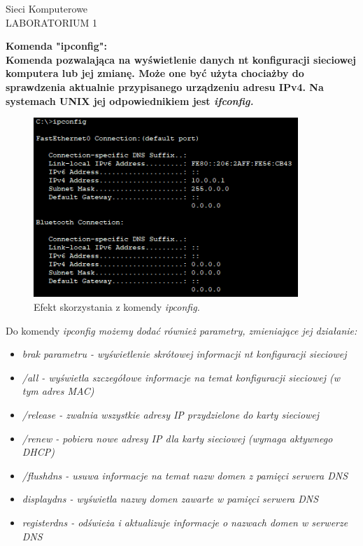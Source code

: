 \documentclass[a4paper,12pt]{article}
\newcommand{\h}[1]{\noindent \bf #1 \rm \\ \noindent}
\newcommand{\italic}[1]{\it #1 \rm}
\begin{document}
\begin{center}
	\LARGE
	Sieci Komputerowe \\
	\large
	LABORATORIUM 1 
\end{center}
\vspace{1cm}
	
\h{Komenda "ipconfig":}
Komenda pozwalająca na wyświetlenie danych nt konfiguracji sieciowej komputera lub jej zmianę. Może one być użyta chociażby do sprawdzenia aktualnie przypisanego urządzeniu adresu IPv4. Na systemach UNIX jej odpowiednikiem jest \it ifconfig\rm.

\begin{figure}[H]
	\centering
	\includegraphics[width=10cm]{fig1.png}
	\caption{Efekt skorzystania z komendy \it ipconfig\rm.}
\end{figure}

\noindent
Do komendy \it ipconfig \rm możemy dodać również parametry, zmieniające jej działanie:
\begin{itemize}
	\item \italic{brak parametru} - wyświetlenie skrótowej informacji nt konfiguracji sieciowej
	\item \italic{/all} - wyświetla szczegółowe informacje na temat konfiguracji sieciowej (w tym adres MAC)
	\item \italic{/release} - zwalnia wszystkie adresy IP przydzielone do karty sieciowej
	\item \italic{/renew} - pobiera nowe adresy IP dla karty sieciowej (wymaga aktywnego DHCP)
	\item \italic{/flushdns} - usuwa informacje na temat nazw domen z pamięci serwera DNS 
	\item \italic{displaydns} - wyświetla nazwy domen zawarte w pamięci serwera DNS
	\item \italic{registerdns} - odświeża i aktualizuje informacje o nazwach domen w serwerze DNS
\end{itemize}
\end{document}
